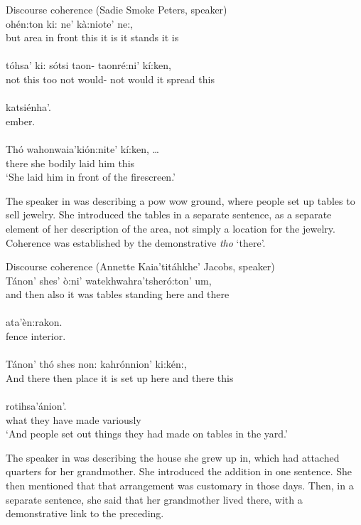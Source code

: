 \documentclass[output=paper,colorlinks,citecolor=brown]{langscibook}
\begin{document}
\ea\label{ex:mithun:13}Discourse coherence (Sadie Smoke Peters, speaker)\\
 ohén:ton        ki:   ne'     kà:niote'    ne:,  \\ 
      but       {area in front} this {it is} {it stands}  {it is}\\
\medskip\\
\gll tóhsa' ki:  sótsi taon- taonré:ni' kí:ken,\\
     not  this   too  {not would-}  {not would it spread} this\\
\medskip\\
\gll katsiénha'.\\ 
     ember.\\
\medskip\\
\gll Thó wahonwaia'kión:nite' kí:ken,  \ldots \\
     there  {she bodily laid him} this\\
\glt  `She laid him in front of the firescreen.'
\z

The speaker in  was describing a pow wow ground, where people set up tables to sell jewelry. She introduced the tables in a separate sentence, as a separate element of her description of the area, not simply a location for the jewelry. Coherence was established by the demonstrative \emph{tho} `there'.

\ea\label{ex:mithun:14}Discourse coherence (Annette Kaia'titáhkhe' Jacobs, speaker)\\
\gll Tánon' shes' ò:ni' {watekhwahra'tsheró:ton' um},\\        
     and then  also  {it was tables standing here and there}\\
\medskip\\
\gll ata'èn:rakon.\\           
     {fence interior}.\\
\medskip\\
\gll Tánon' thó shes non: kahrónnion' ki:kén:,\\
     And  there  then  place {it is set up here and there}  this\\
\medskip\\
 rotihsa'ánion'.\\
what {they have made variously}\\
\glt `And people set out things they had made on tables in the yard.'
\z

The speaker in  was describing the house she grew up in, which had attached quarters for her grandmother. She introduced the addition in one sentence. She then mentioned that that arrangement was customary in those days. Then, in a separate sentence, she said that her grandmother lived there, with a demonstrative link to the preceding.
\end{document}
